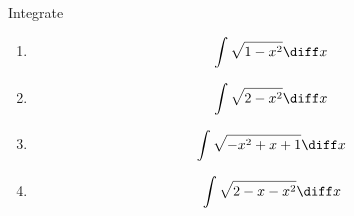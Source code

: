 Integrate
\begin{enumerate}[ref={\fcProblemRef}]
\item 
\[
\int \sqrt{1-x^2}\diff x
\]
\item 
\[
\int \sqrt{2-x^2}\diff x
\]
\item 
\[
\int \sqrt{-x^2+x+1}\diff x
\]
\item 
\[
\int \sqrt{2-x-x^2}\diff x
\]
\end{enumerate}